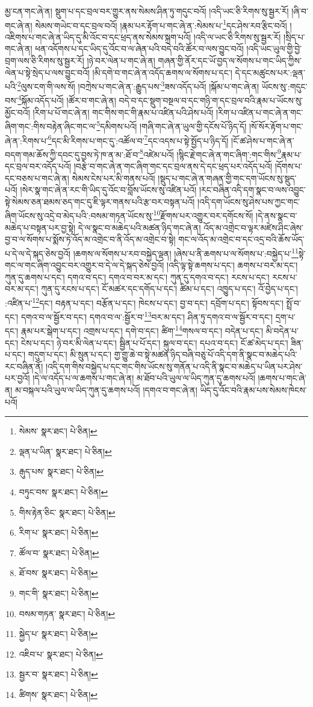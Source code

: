 མྱ་ངན་གང་ཞེ་ན། སྡུག་པ་དང་བྲལ་བར་གྱུར་ནས་སེམས་ཤིན་ཏུ་གདུང་བའོ། །འདི་ཡང་ཅི་རིགས་སུ་སྦྱར་རོ། །ཞི་བ་གང་ཞེ་ན། སེམས་གཡེང་བ་དང་བྲལ་བའོ། །རྣམ་པར་རྟོག་པ་གང་ཞེ་ན་:སེམས་པ་\footnote{སེམས་  སྣར་ཐང་།  པེ་ཅིན། }དང་ཤེས་རབ་རྩིང་བའོ། །འཇིགས་པ་གང་ཞེ་ན་ཡིད་དུ་མི་འོང་བ་དང་ཕྲད་ནས་སེམས་སྐྲག་པའོ། །འདི་ལ་ཡང་ཅི་རིགས་སུ་སྦྱར་རོ། །སྲིད་པ་གང་ཞེ་ན། ཕན་འདོགས་པ་དང་ཡིད་དུ་འོང་བ་ལ་ཞེན་པའི་བདེ་བའི་ཚོར་བ་ལས་བྱུང་བའོ། །འདི་ཡང་ཡུལ་གྱི་བྱེ་བྲག་ལས་ཅི་རིགས་སུ་སྦྱར་རོ། །ཉེ་བར་ལེན་པ་གང་ཞེ་ན། གཞན་གྱི་ནོར་དང་ཡོ་བྱད་ལ་སོགས་པ་གང་ཡིད་ཀྱིས་ལེན་པ་སྟེ་སྲེད་པ་ལས་བྱུང་བའོ། །མི་དགེ་བ་གང་ཞེ་ན་འདོད་ཆགས་ལ་སོགས་པ་དང་། དེ་དང་མཚུངས་པར་:ལྡན་པའི་\footnote{ལྡན་པ་ཡིན་  སྣར་ཐང་།  པེ་ཅིན། }ལུས་ངག་གི་ལས་སོ། །བཀྲེས་པ་གང་ཞེ་ན་:རྒྱུད་པས་\footnote{རྒུད་པས་  སྣར་ཐང་།  པེ་ཅིན། }ཟས་འདོད་པའོ། །སྐོམ་པ་གང་ཞེ་ན། ཡོངས་སུ་:གདུང་བས་\footnote{བཏུང་བས་  སྣར་ཐང་།  པེ་ཅིན། }སྐོམ་འདོད་པའོ། །ཚོར་བ་གང་ཞེ་ན། བདེ་བ་དང་སྡུག་བསྔལ་བ་དང་གཉི་ག་དང་བྲལ་བའི་རྣམ་པ་ཡོངས་སུ་མྱོང་བའོ། །རིག་པ་པོ་གང་ཞེ་ན། གང་གིས་གང་གི་རྣམ་པ་འཛིན་པའི་ཤེས་པའོ། །རིག་པ་འཛིན་པ་གང་ཞེ་ན་གང་ཞིག་གང་:གིས་བརྟེན་ཞིང་གང་ལ་\footnote{གིས་རྟེན་ཅིང་  སྣར་ཐང་།  པེ་ཅིན། }དམིགས་པའོ། །གཞི་གང་ཞེ་ན་ཡུལ་གྱི་དངོས་པོ་ཉིད་དོ། །སོ་སོར་རྟོག་པ་གང་ཞེ་ན་:རིགས་པ་\footnote{རིག་པ་  སྣར་ཐང་།  པེ་ཅིན། }དང་མི་རིགས་པ་གང་དུ་:འཚོལ་བ་\footnote{ཚོལ་བ་  སྣར་ཐང་།  པེ་ཅིན། }དང་འདས་པ་སྟེ་སྤྱོད་པ་ཉིད་དོ། །ངོ་ཚ་ཤེས་པ་གང་ཞེ་ན་བདག་གམ་ཆོས་ཀྱི་དབང་དུ་བྱས་ཏེ་ཁ་ན་མ་:ཐོ་བ་\footnote{ཐོ་བས་  སྣར་ཐང་།  པེ་ཅིན། }འཛེམ་པའོ། །སྙིང་རྗེ་གང་ཞེ་ན་གང་ཞིག་:གང་གིས་\footnote{གང་གི་  སྣར་ཐང་།  པེ་ཅིན། }རྣམ་པ་དང་བྲལ་བར་འདོད་པའོ། །བརྩེ་བ་གང་ཞེ་ན་གང་ཞིག་གང་དང་བྲལ་ནས་དེ་དང་ཕྲད་པར་འདོད་པའོ། །དོགས་པ་དང་བཅས་པ་གང་ཞེ་ན། སེམས་ངེས་པར་མི་གནས་པའོ། །སྡུད་པ་གང་ཞེ་ན་གཞན་གྱི་གང་དག་ཡོངས་སུ་སྡུད་པའོ། །སེར་སྣ་གང་ཞེ་ན་རང་གི་ཡིད་དུ་འོང་བ་བློས་ཡོངས་སུ་འཛིན་པའོ། །རང་བཞིན་འདི་དག་སྣང་བ་ལས་འབྱུང་སྟེ་སེམས་ཅན་ཐམས་ཅད་གང་དུ་ཇི་ལྟར་གནས་པའི་རྩ་བར་བསྟན་པའོ། །འདི་དག་ཡོངས་སུ་ཤེས་པས་ཀྱང་གང་ཞིག་ཡོངས་སུ་འདྲེ་བ་མེད་པའི་:བསམ་གཏན་ཡོངས་སུ་\footnote{བསམ་གཏན་  སྣར་ཐང་།  པེ་ཅིན། }རྫོགས་པར་འགྱུར་བར་དགོངས་སོ། །དེ་ནས་སྣང་བ་མཆེད་པ་བསྟན་པར་བྱ་སྟེ། དེ་ལ་སྣང་བ་མཆེད་པའི་མཚན་ཉིད་གང་ཞེ་ན། འོད་མ་འགྲེང་བ་ལྟར་མཛེས་ཤིང་ཞེས་བྱ་བ་ལ་སོགས་པ་སྨོས་ཏེ་འོད་མ་འགྲེང་བ་ནི་འོད་མ་འགྲེང་བ་སྟེ། གང་ལ་འོད་མ་འགྲེང་བ་དང་འདྲ་བའི་ཆོས་ཡོད་པ་དེ་ལ་དེ་སྐད་ཅེས་བྱའོ། །ཆགས་ལ་སོགས་པ་རབ་བསྐྱེད་ལྡན། །ཞེས་པ་ནི་ཆགས་པ་ལ་སོགས་པ་:བསྐྱེད་པ་\footnote{སྐྱེད་པ་  སྣར་ཐང་།  པེ་ཅིན། }སྟེ་གང་ལ་གང་ཞིག་འབྱུང་བར་འགྱུར་བ་དེ་ལ་དེ་སྐད་ཅེས་བྱའོ། །འདི་ལྟ་སྟེ་ཆགས་པ་དང་། ཆགས་པ་བར་མ་དང་། ཀུན་དུ་ཆགས་པ་དང་། དགའ་བ་དང་། དགའ་བ་བར་མ་དང་། ཀུན་དུ་དགའ་བ་དང་། རངས་པ་དང་། རངས་པ་བར་མ་དང་། ཀུན་དུ་རངས་པ་དང་། ངོ་མཚར་དང་དགོད་པ་དང་། ཚིམ་པ་དང་། འཁྱུད་པ་དང་། འོ་བྱེད་པ་དང་། :འཛིན་པ་\footnote{འཇིབ་པ་  སྣར་ཐང་།  པེ་ཅིན། }དང་། བརྟན་པ་དང་། བརྩོན་པ་དང་། ཁེངས་པ་དང་། བྱ་བ་དང་། དབྲོག་པ་དང་། སྟོབས་དང་། སྤྲོ་བ་དང་། དགའ་བ་ལ་སྦྱོར་བ་དང་། དགའ་བ་ལ་:སྦྱོར་བ་\footnote{སྦྱར་བ་  སྣར་ཐང་།  པེ་ཅིན། }བར་མ་དང་། ཤིན་ཏུ་དགའ་བ་ལ་སྦྱོར་བ་དང་། དྲག་པ་དང་། རྣམ་པར་སྒེག་པ་དང་། འགྲས་པ་དང་། དགེ་བ་དང་། ཚིག་\footnote{ཚིགས་  སྣར་ཐང་།  པེ་ཅིན། }གསལ་བ་དང་། བདེན་པ་དང་། མི་བདེན་པ་དང་། ངེས་པ་དང་། ཉེ་བར་མི་ལེན་པ་དང་། སྦྱིན་པ་པོ་དང་། སྐུལ་བ་དང་། དཔའ་བ་དང་། ངོ་ཚ་མེད་པ་དང་། ཟིན་པ་དང་། གདུག་པ་དང་། མི་སྲུན་པ་དང་། གྱ་གྱུ་ཆེ་བ་སྟེ་མཚན་ཉིད་བཞི་བཅུ་པོ་འདི་དག་ནི་སྣང་བ་མཆེད་པའི་རང་བཞིན་ནོ། །འདི་དག་གིས་བསྐྱེད་པ་དང་གང་གིས་ཡོངས་སུ་གནོན་པ་འདི་ནི་སྣང་བ་མཆེད་པ་ཡིན་པར་ཤེས་པར་བྱའོ། །དེ་ལ་འདོད་པ་ལ་ཆགས་པ་གང་ཞེ་ན། མ་ཐོབ་པའི་ཡུལ་ལ་ཡིད་ཀུན་དུ་ཆགས་པའོ། །ཆགས་པ་གང་ཞེ་ན། མ་བསྐལ་པའི་ཡུལ་ལ་ཡིད་ཀུན་དུ་ཆགས་པའོ། །དགའ་བ་གང་ཞེ་ན། ཡིད་དུ་འོང་བའི་རྣམ་པས་སེམས་ཁེངས་པའོ། 